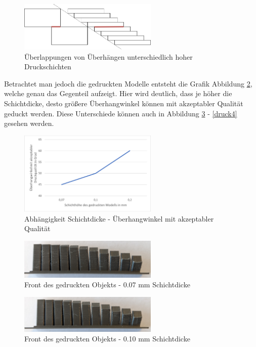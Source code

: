 \documentclass[a4paper,12pt,bibtotocnumbered]{scrartcl}
\numberwithin{equation}{section} %
\begin{document}
\begin{figure}[H]
\centerline{\includegraphics[width=250px]{./images/layerheights.drawio.png}}
\caption{Überlappungen von Überhängen unterschiedlich hoher Druckschichten}
\label{schaubild}
\end{figure}

Betrachtet man jedoch die gedruckten Modelle entsteht die Grafik Abbildung \ref*{abhängigkeit}, welche genau das Gegenteil aufzeigt. Hier wird deutlich, dass je höher die Schichtdicke, desto größere Überhangwinkel können mit akzeptabler Qualität geduckt werden. Diese Unterschiede können auch in Abbildung \ref*{druck1} - \ref*{druck4} gesehen werden.

\begin{figure}[H]
\centerline{\includegraphics[width=250px]{./images/diagramm.png}}
\caption{Abhängigkeit Schichtdicke - Überhangwinkel mit akzeptabler Qualität}
\label{abhängigkeit}
\end{figure}

\begin{figure}[H]
\centerline{\includegraphics[width=250px]{./images/007.jpg}}
\caption{Front des gedruckten Objekts - 0.07 mm Schichtdicke}
\label{druck1}

\end{figure}
\begin{figure}[H]
\centerline{\includegraphics[width=250px]{./images/010.jpg}}
\caption{Front des gedruckten Objekts - 0.10 mm Schichtdicke}
\label{druck2}
\end{figure}
\end{document}
